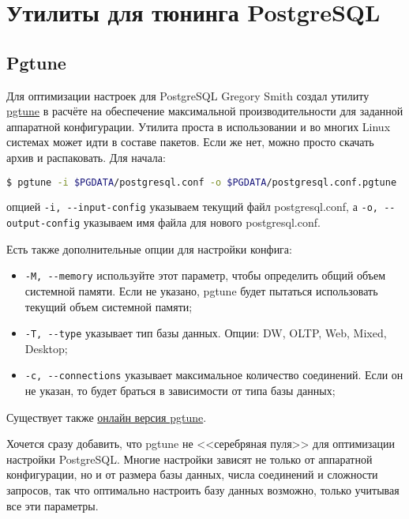 \section{Утилиты для тюнинга PostgreSQL}

\subsection{Pgtune}

Для оптимизации настроек для PostgreSQL Gregory Smith создал утилиту \href{http://pgtune.projects.postgresql.org/}{pgtune} в расчёте на обеспечение максимальной производительности для заданной аппаратной конфигурации. Утилита проста в использовании и во многих Linux системах может идти в составе пакетов. Если же нет, можно просто скачать архив и распаковать. Для начала:

\begin{lstlisting}[language=Bash,label=lst:pgtune_settings1,caption=Pgtune]
$ pgtune -i $PGDATA/postgresql.conf -o $PGDATA/postgresql.conf.pgtune
\end{lstlisting}

опцией \lstinline!-i, --input-config! указываем текущий файл postgresql.conf, а \lstinline!-o, --output-config! указываем имя файла для нового postgresql.conf.

Есть также дополнительные опции для настройки конфига:

\begin{itemize}
  \item \lstinline!-M, --memory! используйте этот параметр, чтобы определить общий объем системной памяти. Если не указано, pgtune будет пытаться использовать текущий объем системной памяти;
  \item \lstinline!-T, --type! указывает тип базы данных. Опции: DW, OLTP, Web, Mixed, Desktop;
  \item \lstinline!-c, --connections! указывает максимальное количество соединений. Если он не указан, то будет браться в зависимости от типа базы данных;
\end{itemize}

Существует также \href{http://pgtune.leopard.in.ua/}{онлайн версия pgtune}.

Хочется сразу добавить, что pgtune не <<серебряная пуля>> для оптимизации настройки PostgreSQL. Многие настройки зависят не только от аппаратной конфигурации, но и от размера базы данных, числа соединений и сложности запросов, так что оптимально настроить базу данных возможно, только учитывая все эти параметры.


